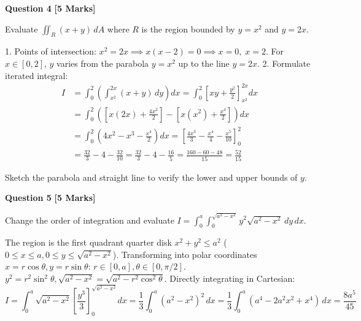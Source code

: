 \vspace{4mm}

\noindent\textbf{Question 4} \hfill \textbf{[5 Marks]}

Evaluate $\iint_R (x + y)\,dA$ where $R$ is the region bounded by $y = x^2$ and $y = 2x$.

\begin{solbox}
1. Points of intersection: $x^2 = 2x \implies x(x-2) = 0 \implies x = 0, \; x = 2$.
For $x \in [0, 2]$, $y$ varies from the parabola $y = x^2$ up to the line $y = 2x$.
2. Formulate iterated integral:
\begin{align}
I &= \int_0^2 \left( \int_{x^2}^{2x} (x + y)\,dy \right) dx = \int_0^2 \left[ x y + \frac{y^2}{2} \right]_{x^2}^{2x} dx \\
&= \int_0^2 \left( \left[x(2x) + \frac{4x^2}{2}\right] - \left[x(x^2) + \frac{x^4}{2}\right] \right) dx \\
&= \int_0^2 \left( 4x^2 - x^3 - \frac{x^4}{2} \right) dx = \left[ \frac{4x^3}{3} - \frac{x^4}{4} - \frac{x^5}{10} \right]_0^2 \\
&= \frac{32}{3} - 4 - \frac{32}{10} = \frac{32}{3} - 4 - \frac{16}{5} = \frac{160 - 60 - 48}{15} = \frac{52}{15}
\end{align}
\end{solbox}

\begin{examinertip}
Sketch the parabola and straight line to verify the lower and upper bounds of $y$.
\end{examinertip}

\vspace{4mm}

\noindent\textbf{Question 5} \hfill \textbf{[5 Marks]}

Change the order of integration and evaluate $I = \int_0^a \int_0^{\sqrt{a^2-x^2}} y^2 \sqrt{a^2-x^2}\,dy\,dx$.

\begin{solbox}
The region is the first quadrant quarter disk $x^2 + y^2 \le a^2$ ($0 \le x \le a, 0 \le y \le \sqrt{a^2-x^2}$).
Transforming into polar coordinates $x = r\cos\theta, y = r\sin\theta$:
$r \in [0, a], \theta \in [0, \pi/2]$.
$y^2 = r^2\sin^2\theta, \sqrt{a^2-x^2} = \sqrt{a^2-r^2\cos^2\theta}$.
Directly integrating in Cartesian:
\begin{equation}
I = \int_0^a \sqrt{a^2-x^2} \left[ \frac{y^3}{3} \right]_0^{\sqrt{a^2-x^2}} dx = \frac{1}{3} \int_0^a (a^2-x^2)^2\,dx = \frac{1}{3} \int_0^a (a^4 - 2a^2 x^2 + x^4)\,dx = \frac{8a^5}{45}
\end{equation}
\end{solbox}

